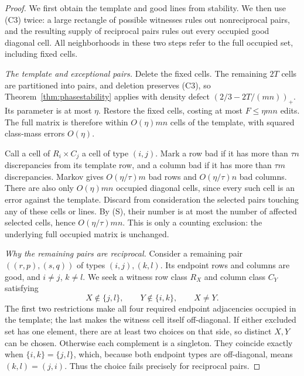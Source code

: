 \documentclass[11pt]{article}
\begin{document}
\begin{proof}
We first obtain the template and good lines from stability. We then use
(C3) twice: a large rectangle of possible witnesses rules out
nonreciprocal pairs, and the resulting supply of reciprocal pairs rules
out every occupied good diagonal cell. All neighborhoods in these two
steps refer to the full occupied set, including fixed cells.

\smallskip\noindent\emph{The template and exceptional pairs.}
Delete the fixed cells. The remaining $2T$ cells are partitioned into
pairs, and deletion preserves (C3), so Theorem~\ref{thm:phasestability}
applies with density defect $(2/3-2T/(mn))_+$. Its parameter is at most
$\eta$. Restore the fixed cells, costing at most $F\le\eta mn$ edits.
The full matrix is therefore within $O(\eta)mn$ cells of the template,
with squared class-mass errors $O(\eta)$.

Call a cell of $R_i\times C_j$ a cell of type $(i,j)$.
Mark a row bad if it has more than $\tau n$ discrepancies from its
template row, and a column bad if it has more than $\tau m$ discrepancies.
Markov gives $O(\eta/\tau)m$ bad rows and $O(\eta/\tau)n$ bad columns.
There are also only $O(\eta)mn$ occupied diagonal cells, since every
such cell is an error against the template. Discard from consideration
the selected pairs touching any of these cells or lines. By (S), their
number is at most the number of affected selected cells, hence
$O(\eta/\tau)mn$. This is only a counting exclusion: the underlying
full occupied matrix is unchanged.

\smallskip\noindent\emph{Why the remaining pairs are reciprocal.}
Consider a remaining pair $((r,p),(s,q))$ of types $(i,j),(k,l)$.
Its endpoint rows and columns are good, and $i\ne j$, $k\ne l$.
We seek a witness row class $R_X$ and column class $C_Y$ satisfying
\[
 X\notin\{j,l\},\qquad Y\notin\{i,k\},\qquad X\ne Y.
\]
The first two restrictions make all four required endpoint adjacencies
occupied in the template; the last makes the witness cell itself
off-diagonal. If either excluded set has one element, there are at least
two choices on that side, so distinct $X,Y$ can be chosen. Otherwise
each complement is a singleton. They coincide exactly when
$\{i,k\}=\{j,l\}$, which, because both endpoint types are off-diagonal,
means $(k,l)=(j,i)$. Thus the choice fails precisely for reciprocal pairs.


\end{proof}
\end{document}
